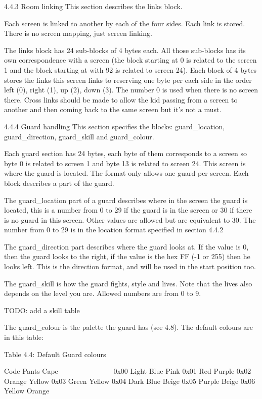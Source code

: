 4.4.3 Room linking
 This section describes the links block.

 Each screen is linked to another by each of the four sides. Each link
 is stored. There is no screen mapping, just screen linking.

 The links block has 24 sub-blocks of 4 bytes each. All those sub-blocks
 has its own correspondence with a screen (the block starting at 0 is
 related to the screen 1 and the block starting at with 92 is related to
 screen 24).
 Each block of 4 bytes stores the links this screen links to reserving one
 byte per each side in the order left (0), right (1), up (2), down (3).
 The number 0 is used when there is no screen there.
 Cross links should be made to allow the kid passing from a screen to
 another and then coming back to the same screen but it's not a must.

4.4.4 Guard handling
 This section specifies the blocks: guard_location, guard_direction,
 guard_skill and guard_colour.

 Each guard section has 24 bytes, each byte of them corresponds to a screen
 so byte 0 is related to screen 1 and byte 13 is related to screen 24.
 This screen is where the guard is located. The format only allows one
 guard per screen. Each block describes a part of the guard.

 The guard_location part of a guard describes where in the screen the guard
 is located, this is a number from 0 to 29 if the guard is in the screen or
 30 if there is no guard in this screen. Other values are allowed but are
 equivalent to 30. The number from 0 to 29 is in the location format
 specified in section 4.4.2

 The guard_direction part describes where the guard looks at. If the value
 is 0, then the guard looks to the right, if the value is the hex FF (-1 or
 255) then he looks left. This is the direction format, and will be used in
 the start position too.

 The guard_skill is how the guard fights, style and lives. Note that the
 lives also depends on the level you are. Allowed numbers are from 0 to 9.

 TODO: add a skill table

 The guard_colour is the palette the guard has (see 4.8).
 The default colours are in this table:

                   Table 4.4: Default Guard colours
                   ~~~~~~~~~~~~~~~~~~~~~~~~~~~~~~~

  Code Pants     Cape
  ~~~~ ~~~~~     ~~~~
  0x00 Light     Blue Pink
  0x01 Red       Purple
  0x02 Orange    Yellow
  0x03 Green     Yellow
  0x04 Dark Blue Beige
  0x05 Purple    Beige
  0x06 Yellow    Orange

